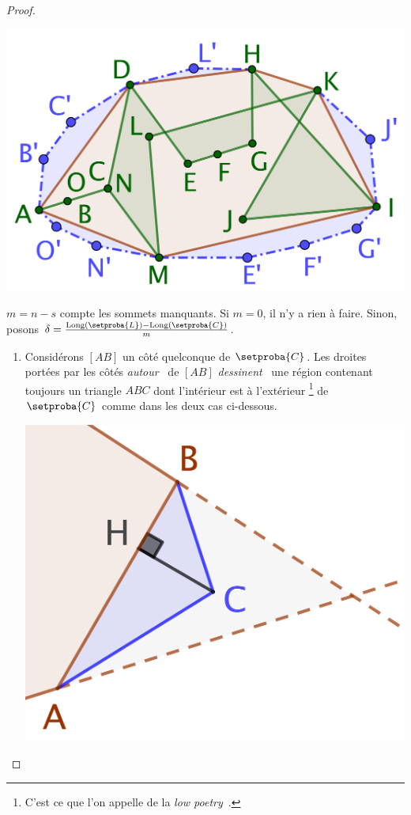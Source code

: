 \begin{proof}
	\begin{center}
		\includegraphics[scale=.45]{content/polygon/geo-area/convex-hull-distortion.png}
	\end{center}


	$m = n - s$ compte les sommets manquants.
	Si $m = 0$, il n'y a rien à faire.
	Sinon, posons $\delta = \frac{\cyclelen{\setproba{L}} - \cyclelen{\setproba{C}}}{m}$.
	\begin{enumerate}
		\item \label{add-vertex-start}
		Considérons $[AB]$ un côté quelconque de $\setproba{C}$.
		Les droites portées par les côtés \og \emph{autour} \fg\ de $[AB]$ \og \emph{dessinent} \fg\ une région contenant toujours un triangle $ABC$ dont l'intérieur est à l'extérieur
		\footnote{
			C'est ce que l'on appelle de la \og \emph{low poetry} \fg\,.
		}
		de $\setproba{C}$ comme dans les deux cas ci-dessous.
		\begin{multicols}{2}
			\centering

			\includegraphics[scale=.35]{content/polygon/geo-area/add-vertex-1.png}


\end{multicols}
\end{enumerate}
\end{proof}
